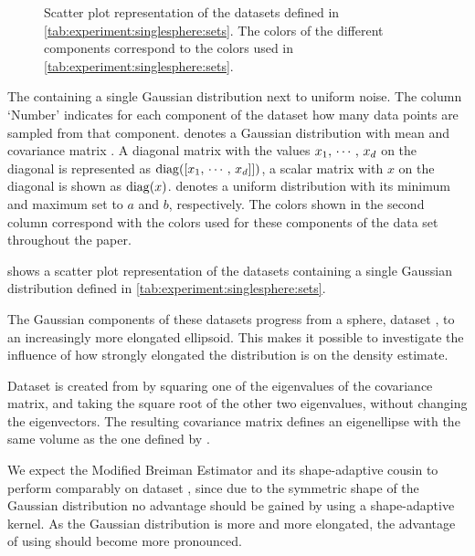 
\begin{figure*}
	\centering
	
	\caption{Scatter plot representation of the datasets defined in \cref{tab:experiment:singlesphere:sets}. The colors of the different components correspond to the colors used in \cref{tab:experiment:singlesphere:sets}.}
	\label{fig:experiment:singlesphere:sets}
\end{figure*}

\begin{table*}
	\centering
	
	\caption{The containing a single Gaussian distribution next to uniform noise. The column `Number' indicates for each component of the dataset how many data points are sampled from that component. \gaussDist{\varMean}{\varCovarianceMatrix} denotes a Gaussian distribution with mean \varMean and covariance matrix \varCovarianceMatrix. A diagonal matrix with the values $x_1,\, \cdots,\, x_d$ on the diagonal is represented as $\operatorname{diag}([x_1,\,\cdots,\,x_d]])$, a scalar matrix with $x$ on the diagonal is shown as $\operatorname{diag}(x)$.  denotes a uniform distribution with its minimum and maximum set to $a$ and $b$, respectively. The colors shown in the second column correspond with the colors used for these components of the data set throughout the paper.} 	
	\label{tab:experiment:singlesphere:sets}
\end{table*}

 shows a scatter plot representation of the datasets containing a single Gaussian distribution defined in \cref{tab:experiment:singlesphere:sets}. 

The Gaussian components of these datasets progress from a sphere, \ie dataset \ferdosiOne, to an increasingly more elongated ellipsoid. This makes it possible to investigate the influence of how strongly elongated the distribution is on the density estimate. 

Dataset \baakmanOne is created from \ferdosiOne by squaring one of the eigenvalues of the covariance matrix, and taking the square root of the other two eigenvalues, without changing the eigenvectors. The resulting covariance matrix defines an eigenellipse with the same volume as the one defined by \ferdosiOne.



	We expect the Modified Breiman Estimator and its shape-adaptive cousin to perform comparably on dataset \ferdosiOne, since due to the symmetric shape of the Gaussian distribution no advantage should be gained by using a shape-adaptive kernel. 
	As the Gaussian distribution is more and more elongated, the advantage of using \sambe should become more pronounced. 